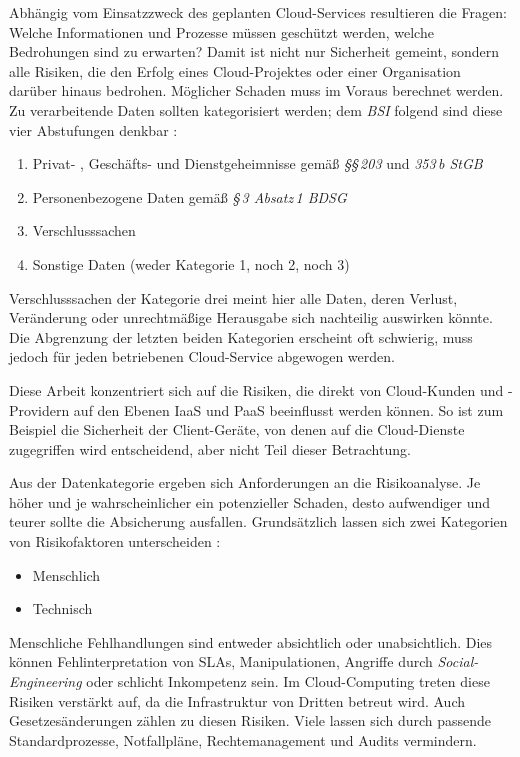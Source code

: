 \noindent
Abhängig vom Einsatzzweck des geplanten Cloud-Services resultieren die Fragen: Welche Informationen und Prozesse müssen geschützt werden, welche Bedrohungen sind zu erwarten? Damit ist nicht nur Sicherheit gemeint, sondern alle Risiken, die den Erfolg eines Cloud-Projektes oder einer Organisation darüber hinaus bedrohen. Möglicher Schaden muss im Voraus berechnet werden. Zu verarbeitende Daten sollten kategorisiert werden; dem \emph{BSI} folgend sind diese vier Abstufungen denkbar \cite{bsi:2014:Anforderungskatalog}:

\begin{enumerate}
	\item Privat- , Geschäfts- und Dienstgeheimnisse gemäß \emph{§§\,203} und \emph{353\,b StGB}
	\item Personenbezogene Daten gemäß \emph{§\,3 Absatz\,1 BDSG}
	\item Verschlusssachen
	\item Sonstige Daten (weder Kategorie 1, noch 2, noch 3)	
\end{enumerate}

\noindent
Verschlusssachen der Kategorie drei meint hier alle Daten, deren Verlust, Veränderung oder unrechtmäßige Herausgabe sich nachteilig auswirken könnte. Die Abgrenzung der letzten beiden Kategorien erscheint oft schwierig, muss jedoch für jeden betriebenen Cloud-Service abgewogen werden.

Diese Arbeit konzentriert sich auf die Risiken, die direkt von Cloud-Kunden und -Providern auf den Ebenen IaaS und PaaS beeinflusst werden können. So ist zum Beispiel die Sicherheit der Client-Geräte, von denen auf die Cloud-Dienste zugegriffen wird entscheidend, aber nicht Teil dieser Betrachtung.

Aus der Datenkategorie ergeben sich Anforderungen an die Risikoanalyse. Je höher und je wahrscheinlicher ein potenzieller Schaden, desto aufwendiger und teurer sollte die Absicherung ausfallen. Grundsätzlich lassen sich zwei Kategorien von Risikofaktoren unterscheiden \cite{monjur:2017:security-taxonomy}:
\begin{itemize}
	\item Menschlich
	\item Technisch
\end{itemize}

\noindent Menschliche Fehlhandlungen sind entweder absichtlich oder unabsichtlich. Dies können Fehlinterpretation von SLAs, Manipulationen, Angriffe durch \emph{Social-Engineering} oder schlicht Inkompetenz sein. Im Cloud-Computing treten diese Risiken verstärkt auf, da die Infrastruktur von Dritten betreut wird. Auch Gesetzesänderungen zählen zu diesen Risiken. Viele lassen sich durch passende Standardprozesse, Notfallpläne, Rechtemanagement und Audits vermindern.

